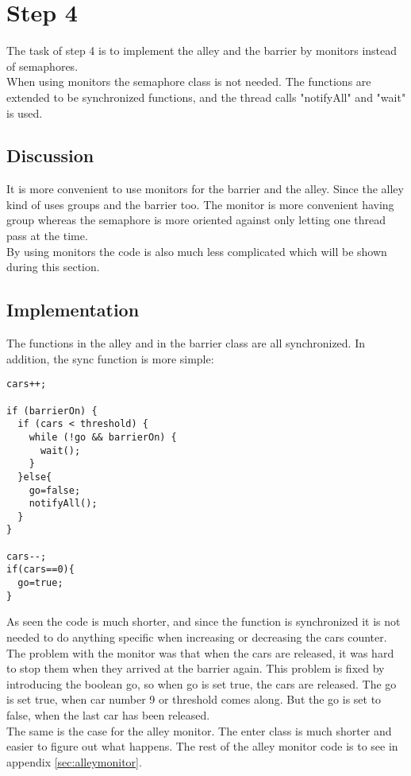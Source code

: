 \section{Step 4}
The task of step 4 is to implement the alley and the barrier by monitors instead of semaphores. \\
When using monitors the semaphore class is not needed. The functions are extended to be synchronized functions, and the thread calls "notifyAll" and "wait" is used.

\subsection{Discussion}
It is more convenient to use monitors for the barrier and the alley. Since the alley kind of uses groups and the barrier too. The monitor is more convenient having group whereas the semaphore is more oriented against only letting one thread pass at the time. \\
By using monitors the code is also much less complicated which will be shown during this section.

\subsection{Implementation}
The functions in the alley and in the barrier class are all synchronized. In addition, the sync function is more simple: 

\begin{lstlisting}
cars++;

if (barrierOn) {
  if (cars < threshold) {
    while (!go && barrierOn) {
      wait();	
    }
  }else{
    go=false;
    notifyAll();
  }
} 

cars--;
if(cars==0){
  go=true;
}
\end{lstlisting}
\vspace{.8cm}

As seen the code is much shorter, and since the function is synchronized it is not needed to do anything specific when increasing or decreasing the cars counter. The problem with the monitor was that when the cars are released, it was hard to stop them when they arrived at the barrier again. This problem is fixed by introducing the boolean go, so when go is set true, the cars are released. The go is set true, when car number 9 or threshold comes along. But the go is set to false, when 
the last car has been released. 
\\

The same is the case for the alley monitor. The enter class is much shorter and easier to figure out what happens. The rest of the alley monitor code is to see in appendix \ref{sec:alleymonitor}. 